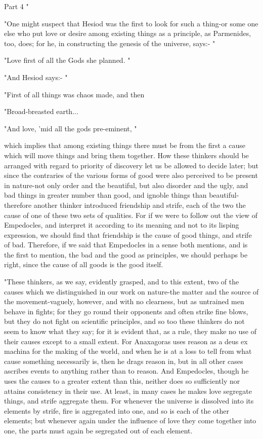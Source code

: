 Part 4 "

"One might suspect that Hesiod was the first to look for such a thing-or
some one else who put love or desire among existing things as a principle,
as Parmenides, too, does; for he, in constructing the genesis of the
universe, says:- "

"Love first of all the Gods she planned. "

"And Hesiod says:- "

"First of all things was chaos made, and then 

"Broad-breasted earth... 

"And love, 'mid all the gods pre-eminent, "

which implies that among existing things there must be from the first
a cause which will move things and bring them together. How these
thinkers should be arranged with regard to priority of discovery let
us be allowed to decide later; but since the contraries of the various
forms of good were also perceived to be present in nature-not only
order and the beautiful, but also disorder and the ugly, and bad things
in greater number than good, and ignoble things than beautiful-therefore
another thinker introduced friendship and strife, each of the two
the cause of one of these two sets of qualities. For if we were to
follow out the view of Empedocles, and interpret it according to its
meaning and not to its lisping expression, we should find that friendship
is the cause of good things, and strife of bad. Therefore, if we said
that Empedocles in a sense both mentions, and is the first to mention,
the bad and the good as principles, we should perhaps be right, since
the cause of all goods is the good itself. 

"These thinkers, as we say, evidently grasped, and to this extent,
two of the causes which we distinguished in our work on nature-the
matter and the source of the movement-vaguely, however, and with no
clearness, but as untrained men behave in fights; for they go round
their opponents and often strike fine blows, but they do not fight
on scientific principles, and so too these thinkers do not seem to
know what they say; for it is evident that, as a rule, they make no
use of their causes except to a small extent. For Anaxagoras uses
reason as a deus ex machina for the making of the world, and when
he is at a loss to tell from what cause something necessarily is,
then he drags reason in, but in all other cases ascribes events to
anything rather than to reason. And Empedocles, though he uses the
causes to a greater extent than this, neither does so sufficiently
nor attains consistency in their use. At least, in many cases he makes
love segregate things, and strife aggregate them. For whenever the
universe is dissolved into its elements by strife, fire is aggregated
into one, and so is each of the other elements; but whenever again
under the influence of love they come together into one, the parts
must again be segregated out of each element. 

